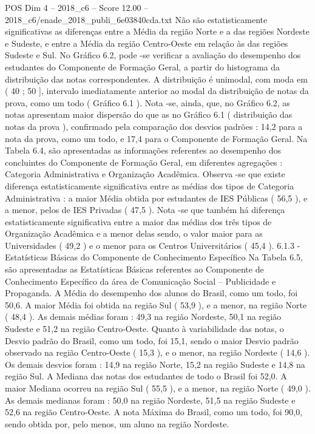 \begin{textsample}{POS Dim 4 – 2018\_c6 – Score 12.00 – 2018\_c6/enade\_2018\_publi\_6e03840cda.txt}
Não são estatisticamente significativas as diferenças entre a Média da região Norte e a das regiões Nordeste e Sudeste, e entre a Média da região Centro-Oeste em relação às das regiões Sudeste e Sul.
No Gráfico 6.2, pode -se verificar a avaliação do desempenho dos estudantes do Componente de Formação Geral, a partir do histograma da distribuição das notas correspondentes.
A distribuição é unimodal, com moda em ( 40 ; 50 ], intervalo imediatamente anterior ao modal da distribuição de notas da prova, como um todo ( Gráfico 6.1 ).
Nota -se, ainda, que, no Gráfico 6.2, as notas apresentam maior dispersão do que as no Gráfico 6.1 ( distribuição das notas da prova ), confirmado pela comparação dos desvios padrões : 14,2 para a nota da prova, como um todo, e 17,4 para o Componente de Formação Geral.
Na Tabela 6.4, são apresentadas as informações referentes ao desempenho dos concluintes do Componente de Formação Geral, em diferentes agregações : Categoria Administrativa e Organização Acadêmica.
Observa -se que existe diferença estatisticamente significativa entre as médias dos tipos de Categoria Administrativa : a maior Média obtida por estudantes de IES Públicas ( 56,5 ), e a menor, pelos de IES Privadas ( 47,5 ).
Nota -se que também há diferença estatisticamente significativa entre a maior das médias dos três tipos de Organização Acadêmica e a menor delas sendo, o valor maior para as Universidades ( 49,2 ) e o menor para os Centros Universitários ( 45,4 ). 6.1.3 - Estatísticas Básicas do Componente de Conhecimento Específico Na Tabela 6.5, são apresentadas as Estatísticas Básicas referentes ao Componente de Conhecimento Específico da área de Comunicação Social – Publicidade e Propaganda.
A Média do desempenho dos alunos do Brasil, como um todo, foi 50,6.
A maior Média foi obtida na região Sul ( 53,9 ), e a menor, na região Norte ( 48,4 ).
As demais médias foram : 49,3 na região Nordeste, 50,1 na região Sudeste e 51,2 na região Centro-Oeste.
Quanto à variabilidade das notas, o Desvio padrão do Brasil, como um todo, foi 15,1, sendo o maior Desvio padrão observado na região Centro-Oeste ( 15,3 ), e o menor, na região Nordeste ( 14,6 ).
Os demais desvios foram : 14,9 na região Norte, 15,2 na região Sudeste e 14,8 na região Sul.
A Mediana das notas dos estudantes de todo o Brasil foi 52,0.
A maior Mediana ocorreu na região Sul ( 55,5 ), e a menor, na região Norte ( 49,0 ).
As demais medianas foram : 50,0 na região Nordeste, 51,5 na região Sudeste e 52,6 na região Centro-Oeste.
A nota Máxima do Brasil, como um todo, foi 90,0, sendo obtida por, pelo menos, um aluno na região Nordeste.

\end{textsample}
